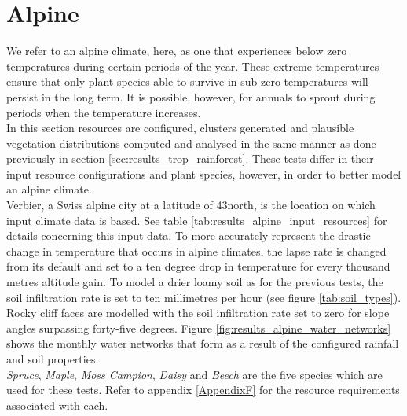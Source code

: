 \section{Alpine} \label{sec:results_alpine}

We refer to an alpine climate, here, as one that experiences below zero temperatures during certain periods of the year. These extreme temperatures ensure that only plant species able to survive in sub-zero temperatures will persist in the long term. It is possible, however, for annuals to sprout during periods when the temperature increases.\\

In this section resources are configured, clusters generated and plausible vegetation distributions computed and analysed in the same manner as done previously in section \ref{sec:results_trop_rainforest}. These tests differ in their input resource configurations and plant species, however, in order to better model an alpine climate. \\
Verbier, a Swiss alpine city at a latitude of 43\textdegree north, is the location on which input climate data is based. See table \ref{tab:results_alpine_input_resources} for details concerning this input data. To more accurately represent the drastic change in temperature that occurs in alpine climates, the lapse rate is changed from its default and set to a ten degree drop in temperature for every thousand metres altitude gain. To model a drier loamy soil as for the previous tests, the soil infiltration rate is set to ten millimetres per hour (see figure \ref{tab:soil_types}). Rocky cliff faces are modelled with the soil infiltration rate set to zero for slope angles surpassing forty-five degrees. Figure \ref{fig:results_alpine_water_networks} shows the monthly water networks that form as a result of the configured rainfall and soil properties. \\
\textit{Spruce}, \textit{Maple}, \textit{Moss Campion}, \textit{Daisy} and \textit{Beech} are the five species which are used for these tests. Refer to appendix \ref{AppendixF} for the resource requirements associated with each.\\

